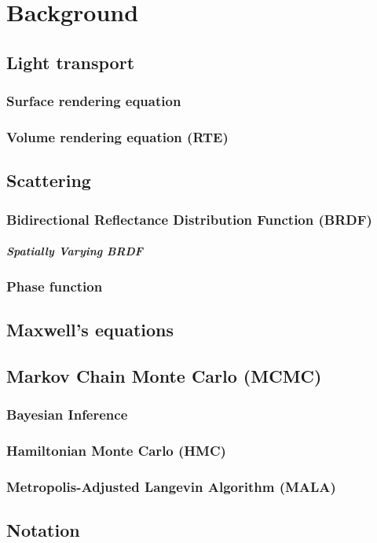 \chapter{Background}
\label{cpt:background}

\section{Light transport}

\subsection{Surface rendering equation}

\subsection{Volume rendering equation (RTE)}

\section{Scattering}

\subsection{Bidirectional Reflectance Distribution Function (BRDF)}

\paragraph{Spatially Varying BRDF}

\subsection{Phase function}

\section{Maxwell's equations}

\section{Markov Chain Monte Carlo (MCMC)}

\subsection{Bayesian Inference}

\subsection{Hamiltonian Monte Carlo (HMC)}

\subsection{Metropolis-Adjusted Langevin Algorithm (MALA)}

\section{Notation}


%


